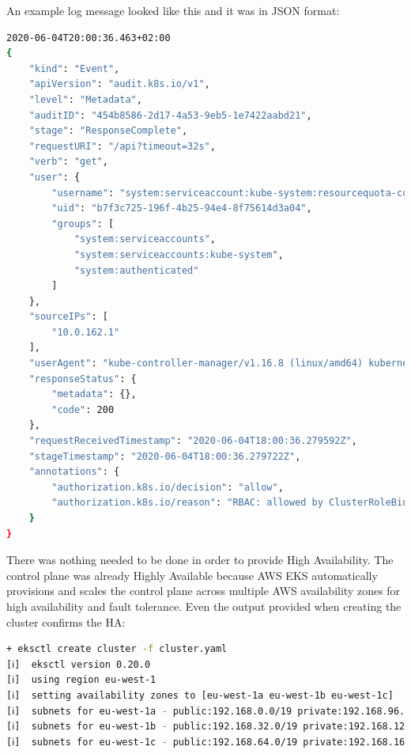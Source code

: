 An example log message looked like this and it was in JSON format:

\begin{lstlisting}[basicstyle=\tiny,caption={TODO},captionpos=b,language=Bash,xleftmargin=1cm]
2020-06-04T20:00:36.463+02:00
{
    "kind": "Event",
    "apiVersion": "audit.k8s.io/v1",
    "level": "Metadata",
    "auditID": "454b8586-2d17-4a53-9eb5-1e7422aabd21",
    "stage": "ResponseComplete",
    "requestURI": "/api?timeout=32s",
    "verb": "get",
    "user": {
        "username": "system:serviceaccount:kube-system:resourcequota-controller",
        "uid": "b7f3c725-196f-4b25-94e4-8f75614d3a04",
        "groups": [
            "system:serviceaccounts",
            "system:serviceaccounts:kube-system",
            "system:authenticated"
        ]
    },
    "sourceIPs": [
        "10.0.162.1"
    ],
    "userAgent": "kube-controller-manager/v1.16.8 (linux/amd64) kubernetes/e163110/system:serviceaccount:kube-system:resourcequota-controller",
    "responseStatus": {
        "metadata": {},
        "code": 200
    },
    "requestReceivedTimestamp": "2020-06-04T18:00:36.279592Z",
    "stageTimestamp": "2020-06-04T18:00:36.279722Z",
    "annotations": {
        "authorization.k8s.io/decision": "allow",
        "authorization.k8s.io/reason": "RBAC: allowed by ClusterRoleBinding \"system:discovery\" of ClusterRole \"system:discovery\" to Group \"system:authenticated\""
    }
}
\end{lstlisting}

There was nothing needed to be done in order to provide High Availability. The control plane was already Highly Available because AWS EKS automatically provisions and scales the control plane across multiple AWS availability zones for high availability and fault tolerance\cite{eks-faqs}. Even the output provided when creating the cluster confirms the HA:
\begin{lstlisting}[basicstyle=\tiny,caption={TODO},captionpos=b,language=Bash,xleftmargin=1cm]
+ eksctl create cluster -f cluster.yaml
[ℹ]  eksctl version 0.20.0
[ℹ]  using region eu-west-1
[ℹ]  setting availability zones to [eu-west-1a eu-west-1b eu-west-1c]
[ℹ]  subnets for eu-west-1a - public:192.168.0.0/19 private:192.168.96.0/19
[ℹ]  subnets for eu-west-1b - public:192.168.32.0/19 private:192.168.128.0/19
[ℹ]  subnets for eu-west-1c - public:192.168.64.0/19 private:192.168.160.0/19
\end{lstlisting}

